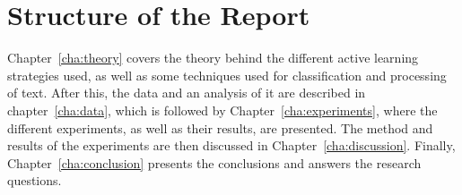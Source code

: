 \section{Structure of the Report}
\label{sec:structure}

Chapter~\ref{cha:theory} covers the theory behind the different active learning strategies used, as well as some techniques used for classification and processing of text.
After this, the data and an analysis of it are described in chapter~\ref{cha:data}, which is followed by Chapter~\ref{cha:experiments}, where the different experiments, as well as their results, are presented.
The method and results of the experiments are then discussed in Chapter~\ref{cha:discussion}.
Finally, Chapter~\ref{cha:conclusion} presents the conclusions and answers the research questions.
